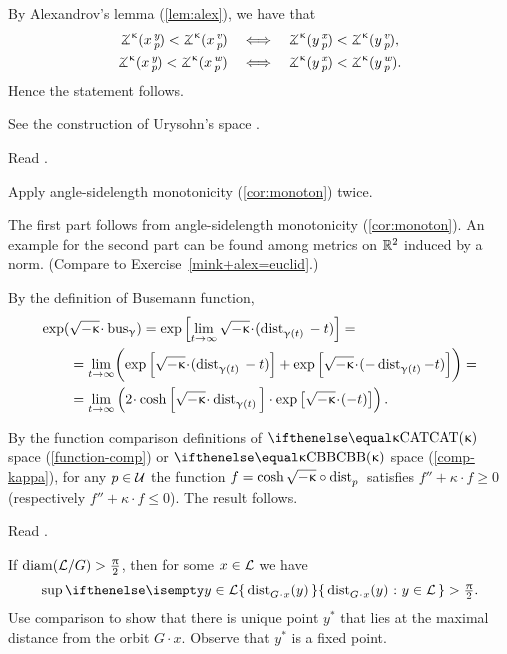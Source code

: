 By Alexandrov's lemma (\ref{lem:alex}), we have that 
\begin{align*}
\angk\kappa xyp<\angk\kappa xvp
\quad&\Longleftrightarrow\quad
\angk\kappa yxp<\angk\kappa yvp,
\\
\angk\kappa xyp<\angk\kappa xwp
\quad&\Longleftrightarrow\quad
\angk\kappa yxp<\angk\kappa ywp.
\end{align*}
Hence the statement follows.


 See the construction of Urysohn's space \cite[3.11$\tfrac{3}{2}_+$]{gromov-MS}.

Read \cite{lebedeva-petrunin}.

 Apply angle-sidelength  monotonicity (\ref{cor:monoton}) twice. 

 The first part follows from angle-sidelength  monotonicity (\ref{cor:monoton}).
An example for the second part can be found among metrics on $\mathbb{R}^2$ induced by a norm. (Compare to Exercise~\ref{mink+alex=euclid}.)

By the definition of Busemann function,
\begin{align*}
\exp(&\sqrt{-\kappa}\cdot\bus_\gamma) 
= \exp \left[\lim_{t\to \infty} \sqrt{-\kappa}\cdot(\distfun{{\gamma (t)}}{}{} - t)\right]=
\\
&= \lim_{t\to \infty} \biggl(\exp \left[\sqrt{-\kappa}\cdot(\distfun{\gamma (t)}{}{} -t)\right]
+\exp\left[\sqrt{-\kappa}\cdot(-\distfun{\gamma (t)}-t)\right]\biggr)=
\\
&=  \lim_{t\to \infty} \left(2\cdot \cosh \left[\sqrt{-\kappa}\cdot\distfun{\gamma (t)}{}{}\right]\cdot \exp\left[\sqrt{-\kappa}\cdot(-t)\right]\right).
\end{align*}

By the function comparison definitions of $\CAT\kappa$ space (\ref{function-comp}) or $\Alex{\kappa}$ space (\ref{comp-kappa}),  for any $p\in \spc{U}$ the function $f=\cosh \sqrt{-\kappa}\circ\distfun{p}{}{}$ satisfies $f''+\kappa \cdot f\ge 0$ (respectively  $f''+\kappa \cdot f\le 0$). The result follows.

 Read \cite{petrunin:globalization}.

 If $\mathop{\rm diam}\nolimits(\mathcal{L}/G)>\tfrac{\uppi}2$, then for some $x\in \spc{L}$ we have
\[\sup \set{\distfun{G\cdot x}(y)}{y\in \spc{L}}
>
\tfrac\pi2.\]
Use comparison to show that there is unique point $y^{*}$ that lies at the maximal distance from the orbit $G\cdot x$.
Observe that $y^{*}$ is a fixed point.

